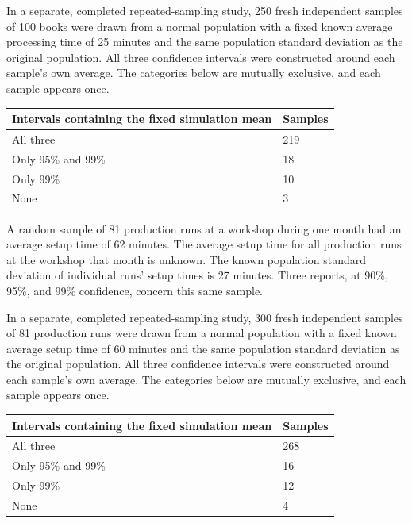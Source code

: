In a separate, completed repeated-sampling study, 250 fresh independent samples of 100 books were drawn from a normal population with a fixed known average processing time of 25 minutes and the same population standard deviation as the original population. All three confidence intervals were constructed around each sample's own average. The categories below are mutually exclusive, and each sample appears once.


\begin{center}\begin{tabular}{@{}ll@{}}\toprule
Intervals containing the fixed simulation mean & Samples\\\midrule
All three & 219\\
Only 95\% and 99\% & 18\\
Only 99\% & 10\\
None & 3\\
\bottomrule\end{tabular}\end{center}


A random sample of 81 production runs at a workshop during one month had an average setup time of 62 minutes. The average setup time for all production runs at the workshop that month is unknown. The known population standard deviation of individual runs' setup times is 27 minutes. Three reports, at 90\%, 95\%, and 99\% confidence, concern this same sample.

In a separate, completed repeated-sampling study, 300 fresh independent samples of 81 production runs were drawn from a normal population with a fixed known average setup time of 60 minutes and the same population standard deviation as the original population. All three confidence intervals were constructed around each sample's own average. The categories below are mutually exclusive, and each sample appears once.


\begin{center}\begin{tabular}{@{}ll@{}}\toprule
Intervals containing the fixed simulation mean & Samples\\\midrule
All three & 268\\
Only 95\% and 99\% & 16\\
Only 99\% & 12\\
None & 4\\
\bottomrule\end{tabular}\end{center}


